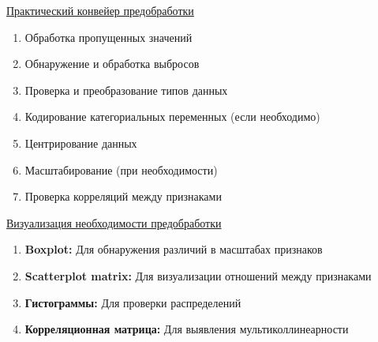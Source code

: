 \underline{Практический конвейер предобработки}

\begin{enumerate}
    \item Обработка пропущенных значений
    \item Обнаружение и обработка выбросов
    \item Проверка и преобразование типов данных
    \item Кодирование категориальных переменных (если необходимо)
    \item Центрирование данных
    \item Масштабирование (при необходимости)
    \item Проверка корреляций между признаками
\end{enumerate}

\underline{Визуализация необходимости предобработки}

\begin{enumerate}
    \item \textbf{Boxplot:} Для обнаружения различий в масштабах признаков
    \item \textbf{Scatterplot matrix:} Для визуализации отношений между признаками
    \item \textbf{Гистограммы:} Для проверки распределений
    \item \textbf{Корреляционная матрица:} Для выявления мультиколлинеарности
\end{enumerate}